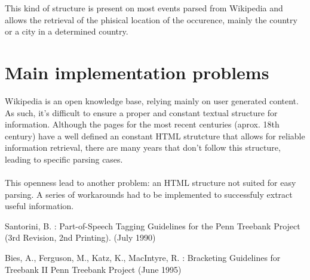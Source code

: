 \documentclass{llncs}
\begin{document}
This kind of structure is present on most events parsed from Wikipedia and allows the retrieval of the phisical location of the occurence, mainly the country or a city in a determined country.

%
\section{Main implementation problems}

Wikipedia is an open knowledge base, relying mainly on user generated content. As such, it's difficult to ensure a proper and constant textual structure for information. Although the pages for the most recent centuries (aprox. 18th century) have a well defined an constant HTML strutcture that allows for reliable information retrieval, there are many years that don't follow this structure, leading to specific parsing cases.\\
\ \\
This openness lead to another problem: an HTML structure not suited for easy parsing. A series of workarounds had to be implemented to successfuly extract useful information.

\newpage
%
%
\begin{thebibliography}{}
%
Santorini, B. :
Part-of-Speech Tagging Guidelines for the
Penn Treebank Project (3rd Revision, 2nd Printing).
(July 1990)

Bies, A., Ferguson, M., Katz, K., MacIntyre, R. :
Bracketing Guidelines for Treebank II
Penn Treebank Project
(June 1995)

\end{thebibliography}
\clearpage
{} %
\renewcommand{\indexname}{Author Index}
\printindex
\clearpage
{} %
\renewcommand{\indexname}{Subject Index}

\end{document}

